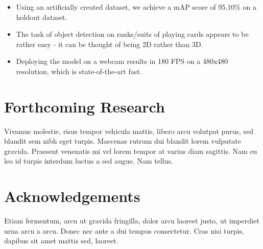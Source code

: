 \documentclass[a0,landscape]{a0poster}
\begin{document}
\begin{multicols}{3}
\begin{itemize}
\item Using an artificially created dataset, we achieve a mAP score of 95.10\% on a holdout dataset.
\item The task of object detection on ranks/suits of playing cards appears to be rather easy - it can be thought of being 2D rather than 3D.
\item Deploying the model on a webcam results in 180 FPS on a 480x480 resolution, which is state-of-the-art fast.

\end{itemize}

\color{DarkSlateGray} %


\section*{Forthcoming Research}

Vivamus molestie, risus tempor vehicula mattis, libero arcu volutpat purus, sed blandit sem nibh eget turpis. Maecenas rutrum dui blandit lorem vulputate gravida. Praesent venenatis mi vel lorem tempor at varius diam sagittis. Nam eu leo id turpis interdum luctus a sed augue. Nam tellus.


\nocite{*} %


\section*{Acknowledgements}

Etiam fermentum, arcu ut gravida fringilla, dolor arcu laoreet justo, ut imperdiet urna arcu a arcu. Donec nec ante a dui tempus consectetur. Cras nisi turpis, dapibus sit amet mattis sed, laoreet.


\end{multicols}
\end{document}
